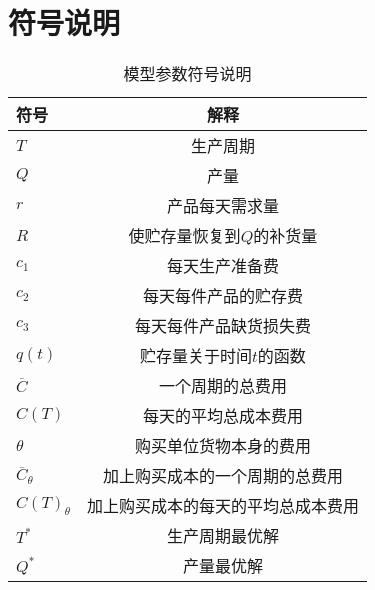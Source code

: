 \section{符号说明}\label{sec:Notation}

\begin{table}[H]
    \centering
    \caption{模型参数符号说明}
    \label{tab:model_symbols}
    \begin{tabular}{lc}
        \toprule
        符号 & 解释 \\
        \midrule
        $T$ & 生产周期 \\
        $Q$ & 产量 \\
        $r$ & 产品每天需求量 \\
        $R$ & 使贮存量恢复到$Q$的补货量 \\
        $c_1$ & 每天生产准备费 \\
        $c_2$ & 每天每件产品的贮存费 \\
        $c_3$ & 每天每件产品缺货损失费 \\
        $q(t)$ & 贮存量关于时间$t$的函数 \\
        $\overline{C}$ & 一个周期的总费用 \\
        $C(T)$ & 每天的平均总成本费用 \\
        $\theta$ & 购买单位货物本身的费用 \\
        $\overline{C}_{\theta}$ & 加上购买成本的一个周期的总费用 \\
        $C(T)_{\theta}$ & 加上购买成本的每天的平均总成本费用 \\
        $T^{*}$ & 生产周期最优解 \\
        $Q^{*}$ & 产量最优解 \\
        \bottomrule
    \end{tabular}
\end{table}
